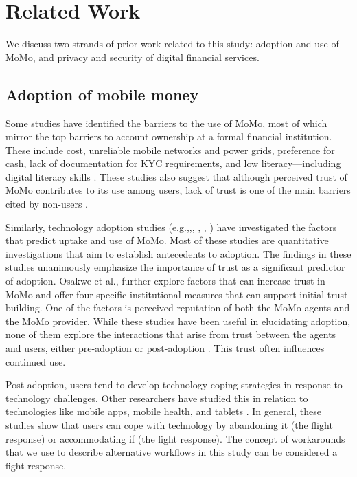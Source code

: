 \section{Related Work}
\label{Sec:related work}
We discuss two strands of prior work related to this study: adoption and use of MoMo, and privacy and security of digital financial services.  

\subsection{Adoption of mobile money}
Some studies have identified the barriers to the use of MoMo, most of which mirror the top barriers to account ownership at a formal financial institution. These include cost, unreliable mobile networks and power grids, preference for cash, lack of documentation for KYC requirements, and low literacy---including digital literacy skills \cite{awanis2022state} \cite{demirgucc2022global}. These studies also suggest that although perceived trust of MoMo contributes to its use among users, lack of trust is one of the main barriers cited by non-users \cite{akinyemi2020determinants} \cite{awanis2022state}.

Similarly, technology adoption studies (e.g.,\cite{baganzi2017examining},\cite{abdul2019customers}, \cite{okello2020trust}, \cite{noreen2021impact}, \cite{osakwe2022trust})  have investigated the factors that predict uptake and use of MoMo. Most of these studies are  quantitative investigations that aim to establish antecedents to adoption. The findings in these studies unanimously emphasize the importance of trust as a significant predictor of adoption. Osakwe et al., \cite{osakwe2022trust} further explore factors that can increase trust in MoMo and offer four specific  institutional measures that can support initial trust building. One of the factors is perceived reputation of both the MoMo agents and the MoMo provider. While these studies have been useful in elucidating adoption, none of them explore the interactions that arise from trust between the agents and users, either pre-adoption or post-adoption
\cite{benbasat2005trust} \cite{sowon2020trust}. This trust often influences continued use.

Post adoption, users tend to develop technology coping strategies in response to technology challenges. Other researchers have studied this in relation to technologies like mobile apps, mobile health, and tablets \cite{inal2019users} \cite{sowon2022information} \cite{zamani2021accommodating}. In general, these studies show that users can cope with technology by abandoning it (the flight response) or accommodating if (the fight response). The concept of workarounds that we use to describe alternative workflows in this study can be considered a fight response.
  
